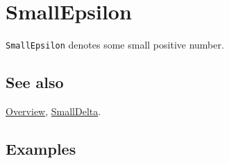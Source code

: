 \documentclass[../FeynCalcManual.tex]{subfiles}
\begin{document}
\hypertarget{smallepsilon}{
\section{SmallEpsilon}\label{smallepsilon}}

\texttt{SmallEpsilon} denotes some small positive number.

\subsection{See also}

\hyperlink{toc}{Overview}, \hyperlink{smalldelta}{SmallDelta}.

\subsection{Examples}
\end{document}
